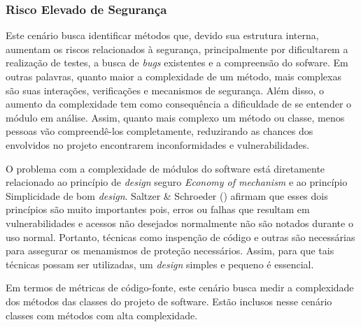 



\subsubsection{Risco Elevado de Segurança}

Este cenário busca identificar métodos que, devido sua estrutura interna, aumentam os riscos relacionados à segurança, principalmente por dificultarem a realização de testes, a busca de \emph{bugs} existentes e a compreensão do sofware. Em outras palavras, quanto maior a complexidade de um método, mais complexas são suas interações, verificações e mecanismos de segurança. Além disso, o aumento da complexidade tem como consequência a dificuldade de se entender o módulo em análise. Assim, quanto mais complexo um método ou classe, menos pessoas vão compreendê-los completamente, reduzirando as chances dos envolvidos no projeto encontrarem inconformidades e vulnerabilidades.

%

O problema com a complexidade de módulos do software está diretamente relacionado ao princípio de \emph{design} seguro \emph{Economy of mechanism} e ao princípio Simplicidade de bom \emph{design}. Saltzer \& Schroeder (\citeyear{schroeder1975}) afirmam que esses dois princípios são muito importantes pois, erros ou falhas que resultam em vulnerabilidades e acessos não desejados normalmente não são notados durante o uso normal. Portanto, técnicas como inspenção de código e outras são necessárias para assegurar os menamismos de proteção necessários. Assim, para que tais técnicas possam ser utilizadas, um \emph{design} simples e pequeno é essencial.

%

Em termos de métricas de código-fonte, este cenário busca medir a complexidade dos métodos das classes do projeto de software. Estão inclusos nesse cenário classes com métodos com alta complexidade. 

